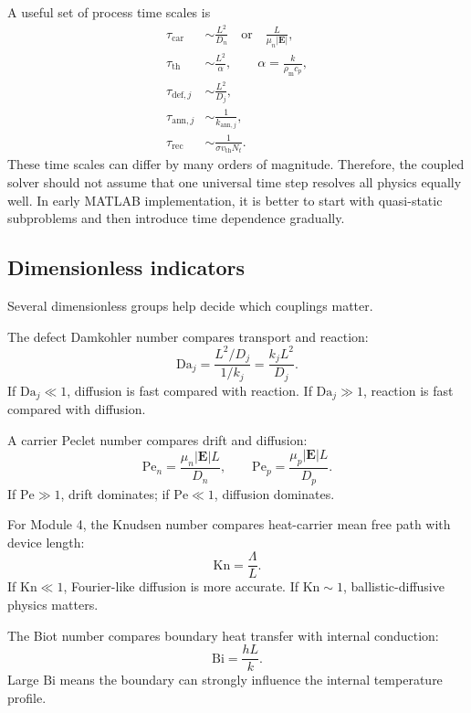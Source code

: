 \documentclass[11pt]{article}
\newcommand{\Evec}{\bm{E}}
\newcommand{\rhom}{\rho_{\mathrm{m}}}
\newcommand{\cpsym}{c_{p}}
\newcommand{\Da}{\mathrm{Da}}
\newcommand{\Pe}{\mathrm{Pe}}
\newcommand{\Bi}{\mathrm{Bi}}
\newcommand{\Kn}{\mathrm{Kn}}
\begin{document}
A useful set of process time scales is
\begin{align}
\tau_{\mathrm{car}} &\sim \frac{L^2}{D_n} \quad \text{or} \quad \frac{L}{\mu_n |\Evec|}, \\
\tau_{\mathrm{th}} &\sim \frac{L^2}{\alpha}, \qquad \alpha=\frac{k}{\rhom\cpsym}, \\
\tau_{\mathrm{def},j} &\sim \frac{L^2}{D_j}, \\
\tau_{\mathrm{ann},j} &\sim \frac{1}{k_{\mathrm{ann},j}}, \\
\tau_{\mathrm{rec}} &\sim \frac{1}{\sigma v_{\mathrm{th}}N_t}.
\end{align}
These time scales can differ by many orders of magnitude. Therefore, the coupled solver should not assume that one universal time step resolves all physics equally well. In early MATLAB implementation, it is better to start with quasi-static subproblems and then introduce time dependence gradually.

\subsection{Dimensionless indicators}

Several dimensionless groups help decide which couplings matter.

The defect Damkohler number compares transport and reaction:
\begin{equation}
\Da_j=\frac{L^2/D_j}{1/k_j}=\frac{k_j L^2}{D_j}.
\end{equation}
If \(\Da_j\ll 1\), diffusion is fast compared with reaction. If \(\Da_j\gg 1\), reaction is fast compared with diffusion.

A carrier Peclet number compares drift and diffusion:
\begin{equation}
\Pe_n=\frac{\mu_n |\Evec|L}{D_n},
\qquad
\Pe_p=\frac{\mu_p |\Evec|L}{D_p}.
\end{equation}
If \(\Pe\gg 1\), drift dominates; if \(\Pe\ll 1\), diffusion dominates.

For Module 4, the Knudsen number compares heat-carrier mean free path with device length:
\begin{equation}
\Kn=\frac{\Lambda}{L}.
\end{equation}
If \(\Kn\ll 1\), Fourier-like diffusion is more accurate. If \(\Kn\sim 1\), ballistic-diffusive physics matters.

The Biot number compares boundary heat transfer with internal conduction:
\begin{equation}
\Bi=\frac{hL}{k}.
\end{equation}
Large \(\Bi\) means the boundary can strongly influence the internal temperature profile.
\end{document}

